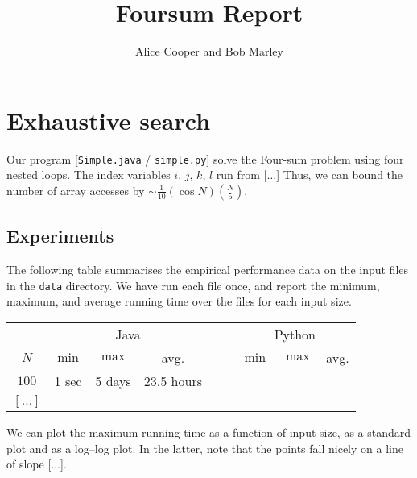 \documentclass{tufte-handout}
\title{Foursum Report}
\author{Alice Cooper and Bob Marley}
\begin{document}
\maketitle
\thispagestyle{empty}

  \section{Exhaustive search}


Our program [\texttt{Simple.java} / \texttt{simple.py}] solve the Four-sum problem using four nested loops.
The index variables $i$, $j$, $k$, $l$ run from [$\ldots$]
Thus, we can bound the number of array accesses by $\sim\frac{1}{10}(\cos N)\binom{N}{5}$.


  \subsection{Experiments}

The following table summarises the empirical performance data on the input files in the \texttt{data} directory.
We have run each file once, and report the minimum, maximum, and average running time over the files for each input size.

  \bigskip\noindent
{ \small
  \begin{tabular}{cccccccc}
  \toprule
& \multicolumn{3}{c}{Java} & $\quad$ & \multicolumn{3}{c}{Python}  \\\cmidrule{2-4} \cmidrule{6-8}
  $N$     & $\min$     & $\max$ & avg. &
          & $\min$     & $\max$ & avg.   \\\midrule
  $100	$ & 1 sec & 5 days & 23.5 hours \\
  $[\ldots]$ \\
  \bottomrule
  \end{tabular}
}

\medskip
We can plot the maximum running time as a function of input size, as a standard plot and as a log--log plot.
In the latter, note that the points fall nicely on a line of slope [$\dots$].
\medskip
\end{document}

